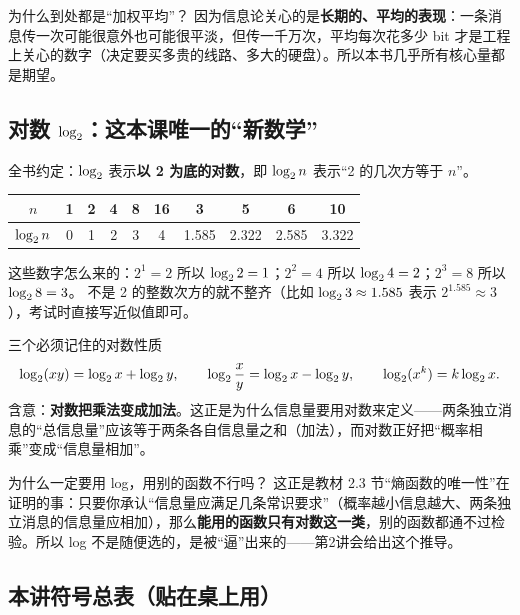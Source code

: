 \begin{qa}{为什么到处都是“加权平均”？}
因为信息论关心的是\textbf{长期的、平均的表现}：一条消息传一次可能很意外也可能很平淡，但传一千万次，平均每次花多少 bit 才是工程上关心的数字（决定要买多贵的线路、多大的硬盘）。所以本书几乎所有核心量都是期望。
\end{qa}

\subsection{对数 $\log_{2}$：这本课唯一的“新数学”}

全书约定：$\log_{2}$ 表示\textbf{以 2 为底的对数}，即 $\log_{2} n$ 表示“2 的几次方等于 $n$”。

\begin{center}
\renewcommand{\arraystretch}{1.25}
\begin{tabular}{c|ccccccccc}
\toprule
$n$ & 1 & 2 & 4 & 8 & 16 & 3 & 5 & 6 & 10\\
\midrule
$\log_{2} n$ & 0 & 1 & 2 & 3 & 4 & 1.585 & 2.322 & 2.585 & 3.322\\
\bottomrule
\end{tabular}
\end{center}

这些数字怎么来的：$2^1=2$ 所以 $\log_{2}2=1$；$2^2=4$ 所以 $\log_{2}4=2$；$2^3=8$ 所以 $\log_{2}8=3$。
不是 2 的整数次方的就不整齐（比如 $\log_{2} 3\approx1.585$ 表示 $2^{1.585}\approx3$），考试时直接写近似值即可。

\begin{defbox}{三个必须记住的对数性质}
\[
\log_{2}(xy)=\log_{2} x+\log_{2} y,\qquad
\log_{2}\frac{x}{y}=\log_{2} x-\log_{2} y,\qquad
\log_{2}(x^{k})=k\log_{2} x .
\]
含意：\textbf{对数把乘法变成加法}。这正是为什么信息量要用对数来定义——两条独立消息的“总信息量”应该等于两条各自信息量之和（加法），而对数正好把“概率相乘”变成“信息量相加”。
\end{defbox}

\begin{qa}{为什么一定要用 log，用别的函数不行吗？}
这正是教材 2.3 节“熵函数的唯一性”在证明的事：只要你承认“信息量应满足几条常识要求”（概率越小信息越大、两条独立消息的信息量应相加），那么\textbf{能用的函数只有对数这一类}，别的函数都通不过检验。所以 log 不是随便选的，是被“逼”出来的——第2讲会给出这个推导。
\end{qa}

\subsection{本讲符号总表（贴在桌上用）}

